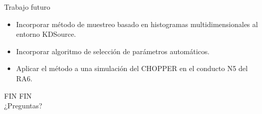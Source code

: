 \documentclass[aspectratio=169,english]{beamer}
\begin{document}
\begin{frame}{Trabajo futuro}

    \begin{itemize}
        \item Incorporar método de muestreo basado en histogramas multidimensionales al entorno KDSource.\\
        \item Incorporar algoritmo de selección de parámetros automáticos.\\
        \item Aplicar el método a una simulación del CHOPPER en el conducto N5 del RA6. \\
    \end{itemize}


\end{frame}

\begin{frame}{FIN}
    \centering
    \Huge{FIN\\}
    \vspace{1cm}
    \LARGE{¿Preguntas?}
\end{frame}



\end{document}
